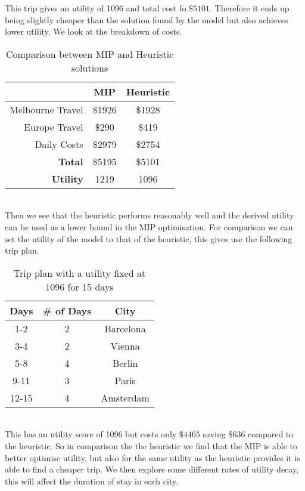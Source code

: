 \documentclass[12pt]{article}
\begin{document}
This trip gives an utility of 1096 and total cost fo $\$5101$. Therefore it ends up being slightly cheaper than the solution found by the model but also achieves lower utility. We look at the breakdown of costs.\\
\begin{table}[h!]
\caption{Comparison between MIP and Heuristic solutions}
\centering
\begin{tabular}{r|c|c}
\hline
& MIP & Heuristic \\
\hline
Melbourne Travel & \$1926 & \$1928 \\
Europe Travel & \$290 & \$419 \\
Daily Costs & \$2979 & \$2754 \\
\hline
\hline
\textbf{Total} & \$5195 & \$5101 \\
\hline
\textbf{Utility} & 1219 & 1096 \\
\hline
\end{tabular}	
\end{table} \\
Then we see that the heuristic performs reasonably well and the derived utility can be used as a lower bound in the MIP optimisation. For comparison we can set the utility of the model to that of the heuristic, this gives use the following trip plan.
\begin{table}[h!]
\caption{Trip plan with a utility fixed at 1096 for 15 days}
\centering
\begin{tabular}{c|c|c}
	\hline
	\rule{0pt}{2ex} Days & \# of Days & City \\
	\hline
	1-2 & 2 & Barcelona \\
	3-4 & 2 & Vienna \\
	5-8 & 4 & Berlin \\
	9-11 & 3 & Paris \\
	12-15 & 4 & Amsterdam \\
	\hline
\end{tabular}
\vspace{1mm}
\end{table}\\
This has an utility score of 1096 but costs only $\$4465$ saving $\$636$ compared to the heuristic. So in comparison the the heuristic we find that the MIP is able to better optimise utility, but also for the same utility as the heuristic provides it is able to find a cheaper trip. We then explore some different rates of utility decay, this will affect the duration of stay in each city.
\end{document}
